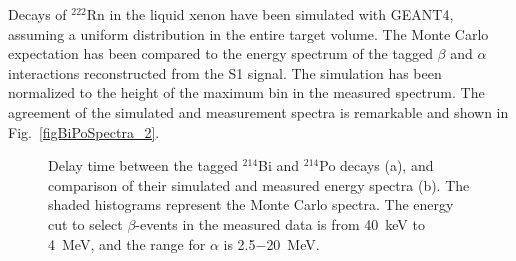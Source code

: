 Decays of $^{222}$Rn in the liquid xenon have been simulated with GEANT4, assuming a uniform distribution in the entire target volume. The Monte Carlo expectation has been compared to the energy spectrum of the tagged $\beta$ and $\alpha$ interactions reconstructed from the S1 signal. The simulation has been normalized to the height of the maximum bin in the measured spectrum. The agreement of the simulated and measurement spectra is remarkable and shown in Fig.~\ref{figBiPoSpectra_2}.

\begin{figure}[!b]
\centering
{}
\caption[Delay time between the tagged $^{214}$Bi and $^{214}$Po decays, and comparison of their simulated and measured energy spectra]{Delay time between the tagged $^{214}$Bi and $^{214}$Po decays (a), and comparison of their simulated and measured energy spectra (b). The shaded histograms represent the Monte Carlo spectra. The energy cut to select $\beta$-events in the measured data is from 40~keV to 4~MeV, and the range for $\alpha$ is 2.5$-$20~MeV.}
\label{figBiPoSpectra}
\end{figure}

